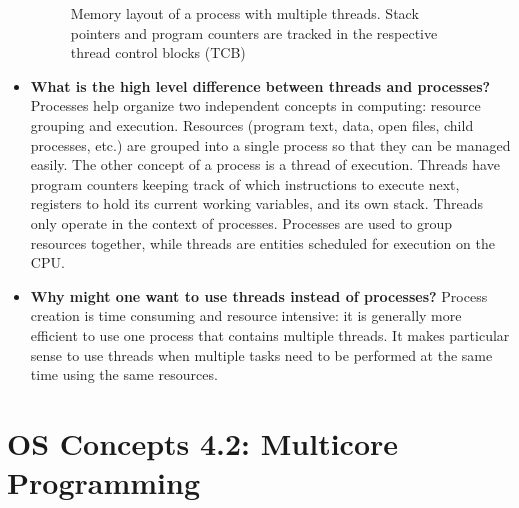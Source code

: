 \documentclass[12pt]{article}
\begin{document}
\begin{itemize}
\begin{figure}[ht]
            \caption{Memory layout of a process with multiple threads. Stack pointers and program counters are tracked in the respective thread control blocks (TCB)}
            \label{fig:thread-memory-layout}
        \end{figure}
    \item \textbf{What is the high level difference between threads and processes?} Processes help organize two independent concepts in computing: resource grouping and execution. Resources (program text, data, open files, child processes, etc.) are grouped into a single process so that they can be managed easily. The other concept of a process is a thread of execution. Threads have program counters keeping track of which instructions to execute next, registers to hold its current working variables, and its own stack. Threads only operate in the context of processes. Processes are used to group resources together, while threads are entities scheduled for execution on the CPU.
    \item \textbf{Why might one want to use threads instead of processes?} Process creation is time consuming and resource intensive: it is generally more efficient to use one process that contains multiple threads. It makes particular sense to use threads when multiple tasks need to be performed at the same time using the same resources.
\end{itemize}

\section*{OS Concepts 4.2: Multicore Programming}
\end{document}
